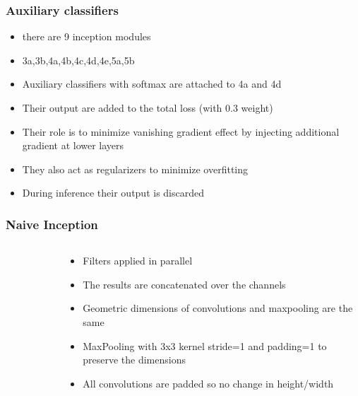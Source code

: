 \documentclass{beamer}
\begin{document}
\begin{frame}
	\frametitle{Auxiliary classifiers}
\begin{itemize}
	\item there are 9 inception modules
	\item 3a,3b,4a,4b,4c,4d,4e,5a,5b
	\item Auxiliary classifiers with softmax are attached to 4a and 4d
	\item Their output are added to the total loss (with 0.3 weight)
	\item Their role is to minimize vanishing gradient effect by injecting additional gradient at lower layers
	\item They also act as regularizers to minimize overfitting
	\item During inference their output is discarded 
\end{itemize}
	

\end{frame}


\begin{frame}
	\frametitle{Naive Inception}
\begin{columns}
	\begin{column}{0.5\textwidth}

	\begin{figure}
    \end{figure}
\end{column}
\begin{column}{0.5\textwidth}
	\begin{itemize}
		\item Filters applied in parallel
		\item The results are concatenated over the channels
		\item Geometric dimensions of convolutions and maxpooling are the same 
		\item MaxPooling with 3x3 kernel stride=1 and padding=1 to preserve the dimensions
		\item All convolutions are padded so no change in height/width
	\end{itemize}
\end{column}
\end{columns}

\end{frame}
\end{document}
